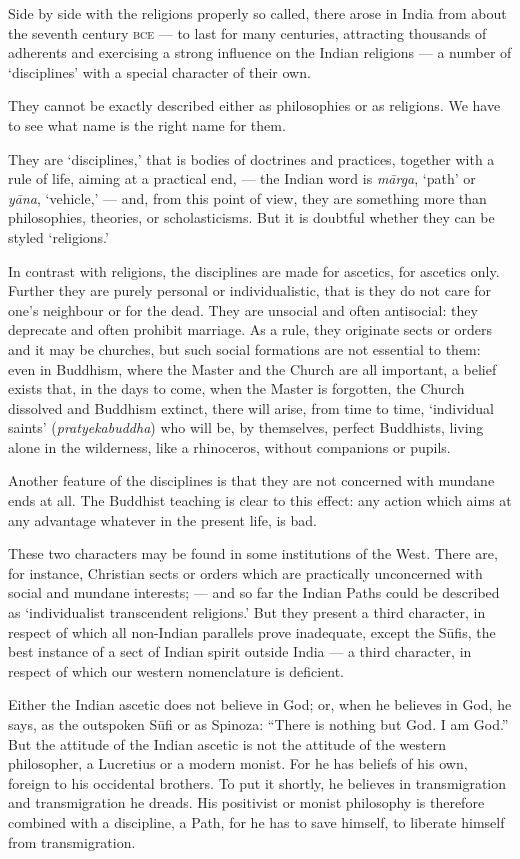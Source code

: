 \documentclass[a4paper, 11pt, oneside, english]{article}
\begin{document}
Side by side with the religions properly so called, there arose in India from about the seventh century \textsc{bce} --- to last for many centuries, attracting thousands of adherents and exercising a strong influence on the Indian religions --- a number of `disciplines' with a special character of their own.

They cannot be exactly described either as philosophies or as religions. We have to see what name is the right name for them.

They are `disciplines,' that is bodies of doctrines and practices, together with a rule of life, aiming at a practical end, --- the Indian word is \emph{mārga}, `path' or \emph{yāna}, `vehicle,' --- and, from this point of view, they are something more than philosophies, theories, or scholasticisms. But it is doubtful whether they can be styled `religions.'

In contrast with religions, the disciplines are made for ascetics, for ascetics only. Further they are purely personal or individualistic, that is they do not care for one's neighbour or for the dead. They are unsocial and often antisocial: they deprecate and often prohibit marriage. As a rule, they originate sects or orders and it may be churches, but such social formations are not essential to them: even in Buddhism, where the Master and the Church are all important, a belief exists that, in the days to come, when the Master is forgotten, the Church dissolved and Buddhism extinct, there will arise, from time to time, `individual saints' (\emph{pratyekabuddha}) who will be, by themselves, perfect Buddhists, living alone in the wilderness, like a rhinoceros, without companions or pupils.

Another feature of the disciplines is that they are not concerned with mundane ends at all. The Buddhist teaching is clear to this effect: any action which aims at any advantage whatever in the present life, is bad.

These two characters may be found in some institutions of the West. There are, for instance, Christian sects or orders which are practically unconcerned with social and mundane interests; --- and so far the Indian Paths could be described as `individualist transcendent religions.' But they present a third character, in respect of which all non-Indian parallels prove inadequate, except the Sūfis, the best instance of a sect of Indian spirit outside India --- a third character, in respect of which our western nomenclature is deficient.

Either the Indian ascetic does not believe in God; or, when he believes in God, he says, as the outspoken Sūfi or as Spinoza: ``There is nothing but God. I am God.'' But the attitude of the Indian ascetic is not the attitude of the western philosopher, a Lucretius or a modern monist. For he has beliefs of his own, foreign to his occidental brothers. To put it shortly, he believes in transmigration and transmigration he dreads. His positivist or monist philosophy is therefore combined with a discipline, a Path, for he has to save himself, to liberate himself from transmigration.
\end{document}
